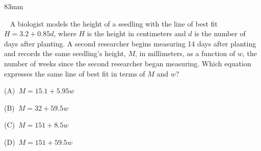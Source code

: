 \documentclass[a4paper]{article}
\newcommand{\COLW}{83mm}
\newcommand{\pnum}[1]{\fcolorbox{ink}{white}{\sffamily\bfseries\fontsize{8}{8}\selectfont #1}~}
\begin{document}
\begin{textblock*}{\COLW}
{{\noindent\pnum{15} A biologist models the height of a seedling with the line of best fit $H=3.2+0.85d$, where $H$ is the height in centimeters and $d$ is the number of days after planting. A second researcher begins measuring 14 days after planting and records the same seedling's height, $M$, in millimeters, as a function of $w$, the number of weeks since the second researcher began measuring. Which equation expresses the same line of best fit in terms of $M$ and $w$?\par\vspace{2.2mm}
\noindent\hangindent=13mm\hspace*{7mm}(A)\ $M=15.1+5.95w$\par
\vspace{1.8mm}\noindent\hangindent=13mm\hspace*{7mm}(B)\ $M=32+59.5w$\par
\vspace{1.8mm}\noindent\hangindent=13mm\hspace*{7mm}(C)\ $M=151+8.5w$\par
\vspace{1.8mm}\noindent\hangindent=13mm\hspace*{7mm}(D)\ $M=151+59.5w$\par
\vfill}}
\end{textblock*}
\clearpage
\end{document}
